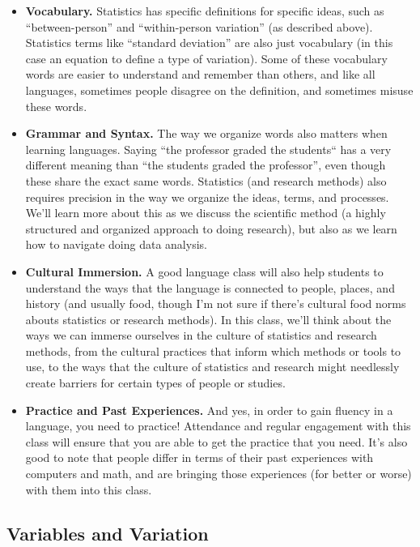 \documentclass[
  letterpaper,
  DIV=11,
  numbers=noendperiod]{scrreprt}
\begin{document}
\begin{itemize}
\item
  \textbf{Vocabulary.} Statistics has specific definitions for specific
  ideas, such as ``between-person'' and ``within-person variation'' (as
  described above). Statistics terms like ``standard deviation'' are
  also just vocabulary (in this case an equation to define a type of
  variation). Some of these vocabulary words are easier to understand
  and remember than others, and like all languages, sometimes people
  disagree on the definition, and sometimes misuse these words.
\item
  \textbf{Grammar and Syntax.} The way we organize words also matters
  when learning languages. Saying ``the professor graded the students``
  has a very different meaning than ``the students graded the
  professor'', even though these share the exact same words. Statistics
  (and research methods) also requires precision in the way we organize
  the ideas, terms, and processes. We'll learn more about this as we
  discuss the scientific method (a highly structured and organized
  approach to doing research), but also as we learn how to navigate
  doing data analysis.
\item
  \textbf{Cultural Immersion.} A good language class will also help
  students to understand the ways that the language is connected to
  people, places, and history (and usually food, though I'm not sure if
  there's cultural food norms abouts statistics or research methods). In
  this class, we'll think about the ways we can immerse ourselves in the
  culture of statistics and research methods, from the cultural
  practices that inform which methods or tools to use, to the ways that
  the culture of statistics and research might needlessly create
  barriers for certain types of people or studies.
\item
  \textbf{Practice and Past Experiences.} And yes, in order to gain
  fluency in a language, you need to practice! Attendance and regular
  engagement with this class will ensure that you are able to get the
  practice that you need. It's also good to note that people differ in
  terms of their past experiences with computers and math, and are
  bringing those experiences (for better or worse) with them into this
  class.
\end{itemize}

\subsection{Variables and Variation}\label{variables-and-variation}
\end{document}
